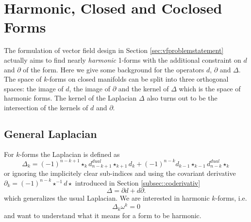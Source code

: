 

\section{Harmonic, Closed and Coclosed Forms}
The formulation of vector field design in Section \ref{sec:vfproblemstatement} actually aims to find  nearly \emph{harmonic} 1-forms with the additional constraint on $d$ and $\partial$ of the form. Here we give some background for the operators $d$, $\partial$ and $\Delta$. The space of $k$-forms on closed  manifolds can be split into three orthogonal spaces: the image of $d$, the image of $\partial$ and the kernel of $\Delta$ which is the space of harmonic forms. The kernel of the Laplacian $\Delta$ also turns out to be the intersection of the kernels of $d$ and $\partial$.

\subsection{General Laplacian}
For $k$-forms the Laplacian is defined as 
\[\Delta_k = (-1)^{n-k+1}\star_{k} d_{n-k+1}^{dual} \star_{k+1}d_k + (-1)^{n-k}d_{k-1}\star_{k-1}d_{n-k}^{dual} \star_{k}\]
or ignoring the implicitely clear sub-indices and using the covariant derivative $\partial_k = (-1)^{n-k}\star^{-1} d \star$ introduced in Section \ref{subsec::coderivativ} 
\[\Delta = \partial d + d \partial .\]
which generalizes the usual Laplacian. We are interested in harmonic $k$-forms, i.e.
\[\Delta_k \omega^k = 0\]
and want to understand what it means for a form to be harmonic. 

